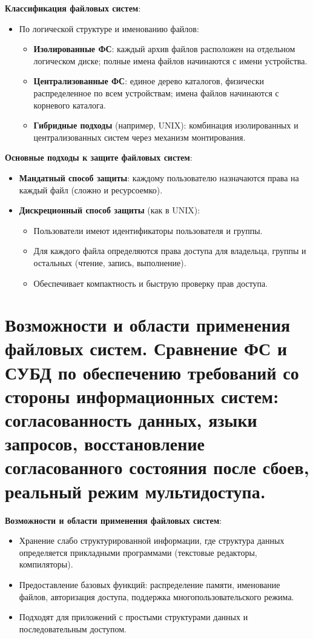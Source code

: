 \documentclass[a4paper,12pt]{article}
\begin{document}
\textbf{Классификация файловых систем}:

\begin{itemize}
    \item По логической структуре и именованию файлов:
    \begin{itemize}
        \item \textbf{Изолированные ФС}: каждый архив файлов расположен на отдельном логическом диске; полные имена файлов начинаются с имени устройства.
        \item \textbf{Централизованные ФС}: единое дерево каталогов, физически распределенное по всем устройствам; имена файлов начинаются с корневого каталога.
        \item \textbf{Гибридные подходы} (например, UNIX): комбинация изолированных и централизованных систем через механизм монтирования.
    \end{itemize}
\end{itemize}

\textbf{Основные подходы к защите файловых систем}:

\begin{itemize}
    \item \textbf{Мандатный способ защиты}: каждому пользователю назначаются права на каждый файл (сложно и ресурсоемко).
    \item \textbf{Дискреционный способ защиты} (как в UNIX):
    \begin{itemize}
        \item Пользователи имеют идентификаторы пользователя и группы.
        \item Для каждого файла определяются права доступа для владельца, группы и остальных (чтение, запись, выполнение).
        \item Обеспечивает компактность и быструю проверку прав доступа.
    \end{itemize}
\end{itemize}

\section{Возможности и области применения файловых систем. Сравнение ФС и СУБД по обеспечению требований со стороны информационных систем: согласованность данных, языки запросов, восстановление согласованного состояния после сбоев, реальный режим мультидоступа.}

\textbf{Возможности и области применения файловых систем}:

\begin{itemize}
    \item Хранение слабо структурированной информации, где структура данных определяется прикладными программами (текстовые редакторы, компиляторы).
    \item Предоставление базовых функций: распределение памяти, именование файлов, авторизация доступа, поддержка многопользовательского режима.
    \item Подходят для приложений с простыми структурами данных и последовательным доступом.
\end{itemize}
\end{document}
